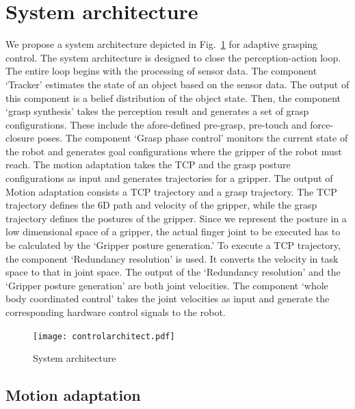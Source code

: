 \section{System architecture}
We propose a system architecture depicted in Fig.~\ref{fig:adaptive_control_architecture} for adaptive grasping control. The system architecture is designed to close the perception-action loop.  The entire loop begins with the processing of sensor data. The component `Tracker' estimates the state of an object based on the sensor data. The output of this component is a belief distribution of the object state. Then, the component `grasp synthesis' takes the perception result and generates a set of grasp configurations. These include the afore-defined pre-grasp, pre-touch and force-closure poses. The component `Grasp phase control' monitors the current state of the robot and generates goal configurations where the gripper of the robot must reach. The motion adaptation takes the TCP and the grasp posture configurations as input and generates trajectories for a gripper.   The output of Motion adaptation consists a TCP trajectory and a grasp trajectory. The TCP trajectory defines the 6D path and velocity of the gripper, while the grasp trajectory defines the postures of the gripper. Since we represent the posture in a low dimensional space of a gripper, the actual finger joint to be executed has to be calculated by the `Gripper posture generation.' To execute a TCP trajectory, the component `Redundancy resolution' is used. It converts the velocity in task space to that in joint space. The output of the `Redundancy resolution' and the `Gripper posture generation' are both joint velocities. The component `whole body coordinated control' takes the joint velocities as input and generate the corresponding hardware control signals to the robot.


\begin{figure}[!htbp]
\centering
\texttt{[image: controlarchitect.pdf]}
\captionsetup{justification=raggedright}
\caption{System architecture}
\label{fig:adaptive_control_architecture}       %
\end{figure}   




\subsection{Motion adaptation}
